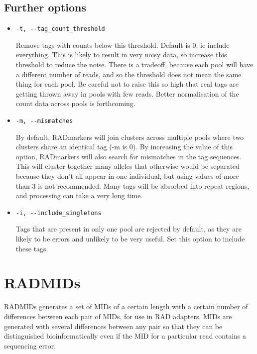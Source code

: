 \documentclass[a4paper]{article}
\begin{document}
\subsection{Further options}

\begin{itemize}
    \item \verb|-t, --tag_count_threshold|
    
    Remove tags with counts below this threshold. Default is 0, ie include everything. This is likely to result in very noisy data, so increase this threshold to reduce the noise. There is a tradeoff, because each pool will have a different number of reads, and so the threshold does not mean the same thing for each pool. Be careful not to raise this so high that real tags are getting thrown away in pools with few reads. Better normalisation of the count data across pools is forthcoming.
    
    \item \verb|-m, --mismatches|
    
    By default, RADmarkers will join clusters across multiple pools where two clusters share an identical tag (-m is 0). By increasing the value of this option, RADmarkers will also search for mismatches in the tag sequences. This will cluster together many alleles that otherwise would be separated because they don't all appear in one individual, but using values of more than 3 is not recommended. Many tags will be absorbed into repeat regions, and processing can take a very long time.
    
    \item \verb|-i, --include_singletons|
    
    Tags that are present in only one pool are rejected by default, as they are likely to be errors and unlikely to be very useful. Set this option to include these tags.
    
\end{itemize}

\section{RADMIDs}

RADMIDs generates a set of MIDs of a certain length with a certain number of differences between each pair of MIDs, for use in RAD adapters. MIDs are generated with several differences between any pair so that they can be distinguished bioinformatically even if the MID for a particular read contains a sequencing error.
\end{document}
